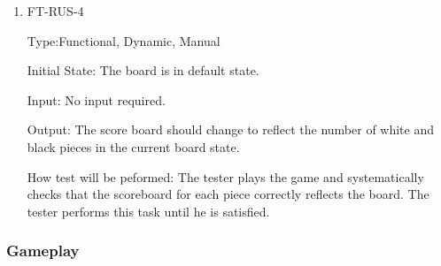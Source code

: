 \documentclass[12pt, titlepage]{article}
\begin{document}
\begin{enumerate}
	\item FT-RUS-4

	      Type:Functional, Dynamic, Manual

	      Initial State:  The board is in default state.

	      Input: No input required.

	      Output:  The score board should change to reflect the number of white and black pieces in the current board state.

	      How test will be peformed: The tester plays the game and systematically checks that the scoreboard for each piece correctly reflects the board. The tester performs this task until he is satisfied.
\end{enumerate}

\subsubsection {Gameplay}
\end{document}

